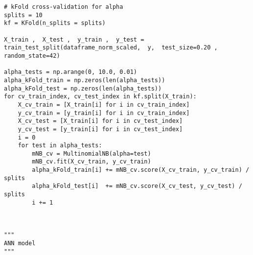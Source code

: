 \documentclass[11pt,a4paper]{article}
\begin{document}
\begin{lstlisting}
# kFold cross-validation for alpha
splits = 10
kf = KFold(n_splits = splits)

X_train ,  X_test ,  y_train ,  y_test = train_test_split(dataframe_norm_scaled,  y,  test_size=0.20 ,  random_state=42)

alpha_tests = np.arange(0, 10.0, 0.01)
alpha_kFold_train = np.zeros(len(alpha_tests))
alpha_kFold_test = np.zeros(len(alpha_tests))
for cv_train_index, cv_test_index in kf.split(X_train):
    X_cv_train = [X_train[i] for i in cv_train_index]
    y_cv_train = [y_train[i] for i in cv_train_index]
    X_cv_test = [X_train[i] for i in cv_test_index]
    y_cv_test = [y_train[i] for i in cv_test_index]
    i = 0
    for test in alpha_tests:
        mNB_cv = MultinomialNB(alpha=test)
        mNB_cv.fit(X_cv_train, y_cv_train)
        alpha_kFold_train[i] += mNB_cv.score(X_cv_train, y_cv_train) / splits
        alpha_kFold_test[i]  += mNB_cv.score(X_cv_test, y_cv_test) / splits
        i += 1



"""
ANN model
"""

\end{lstlisting}
\end{document}
